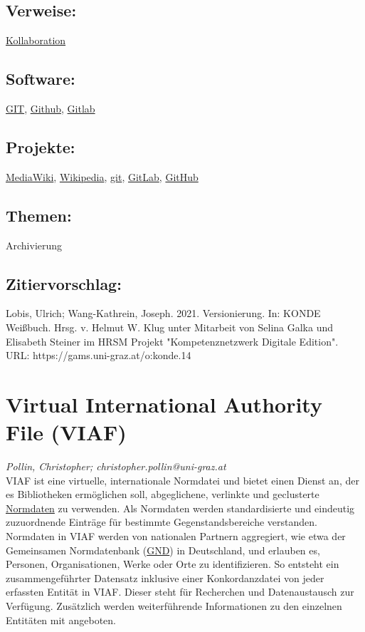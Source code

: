 \documentclass{article}
\begin{document}
        \subsection*{Verweise:}\href{https://gams.uni-graz.at/o:konde.104}{Kollaboration}\subsection*{Software:}\href{https://git-scm.com/}{GIT}, \href{http://github.com}{Github}, \href{http://gitlab.com/}{Gitlab}\subsection*{Projekte:}\href{https://www.mediawiki.org/wiki/MediaWiki/de}{MediaWiki}, \href{https://de.wikipedia.org/wiki/Wikipedia:Hauptseite}{Wikipedia}, \href{https://git-scm.com/}{git}, \href{https://about.gitlab.com/}{GitLab}, \href{https://github.com/}{GitHub}\subsection*{Themen:}Archivierung\subsection*{Zitiervorschlag:}Lobis, Ulrich; Wang-Kathrein, Joseph. 2021. Versionierung. In: KONDE Weißbuch. Hrsg. v. Helmut W. Klug unter Mitarbeit von Selina Galka und Elisabeth Steiner im HRSM Projekt "Kompetenznetzwerk Digitale Edition". URL: https://gams.uni-graz.at/o:konde.14\newpage\section*{Virtual International Authority File (VIAF)} \emph{Pollin, Christopher; christopher.pollin@uni-graz.at }\\
        
    VIAF ist eine virtuelle, internationale Normdatei und bietet einen Dienst an, der es Bibliotheken ermöglichen soll, abgeglichene, verlinkte und geclusterte \href{http://gams.uni-graz.at/o:konde.147}{Normdaten} zu verwenden. Als Normdaten werden standardisierte und eindeutig zuzuordnende Einträge für bestimmte Gegenstandsbereiche verstanden.\\
            
        Normdaten in VIAF werden von nationalen Partnern aggregiert, wie etwa der Gemeinsamen Normdatenbank (\href{http://gams.uni-graz.at/o:konde.109}{GND}) in Deutschland, und erlauben es, Personen, Organisationen, Werke oder Orte zu identifizieren. So entsteht ein zusammengeführter Datensatz inklusive einer Konkordanzdatei von jeder erfassten Entität in VIAF. Dieser steht für Recherchen und Datenaustausch zur Verfügung. Zusätzlich werden weiterführende Informationen zu den einzelnen Entitäten mit angeboten. \\
            
\end{document}
